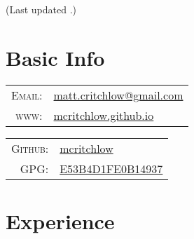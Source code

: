 \documentclass[letterpaper,10pt]{article}
\author{Matthew Critchlow}
\date{\today}
\renewcommand{\maketitle}{
\par{\centering{\Huge  \textsc{\theauthor}}\par}
{\footnotesize\hfill{}\color{lightgray}(Last updated \thedate.)}}
\begin{document}
\maketitle

\section{Basic Info}

\vspace{.25cm}

\begin{minipage}[t]{.5\linewidth}

\begin{tabular}{rp{.75\linewidth}}
    \textsc{Email:}     & \href{mailto:matt.critchlow@gmail.com}{matt.critchlow@gmail.com}\\
    \textsc{www:}&\href{https://mcritchlow.github.io}{mcritchlow.github.io}
\end{tabular}
\end{minipage}
\begin{minipage}[t]{.5\linewidth}
\begin{tabular}{rl}
\textsc{Github:} & \href{http://github.com/mcritchlow}{mcritchlow}\\
\textsc{GPG:}&\href{http://pgp.mit.edu/pks/lookup?op=get&search=0xE53B4D1FE0B14937}{E53B4D1FE0B14937}
\end{tabular}
\end{minipage}

\vspace{.25cm}

\section{Experience}
\end{document}

